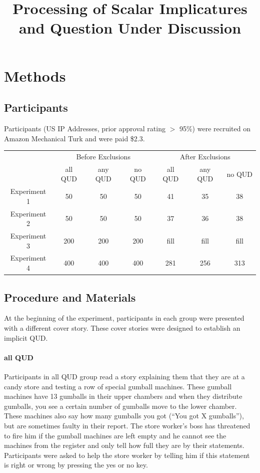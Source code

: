 \documentclass[12pt]{article}
\title{Processing of Scalar Implicatures and Question Under Discussion}
\begin{document}
 
\maketitle 

\section{Methods}
    \subsection*{Participants}

Participants (US IP Addresses, prior approval rating $>$ 95\%) were recruited on Amazon Mechanical Turk and were paid \$2.3.

\begin{table}[h]
\begin{tabular}{ccccccc}
& \multicolumn{3}{c}{Before Exclusions} & \multicolumn{3}{c}{After Exclusions} \\
& all QUD & any QUD & no QUD & all QUD & any QUD & no QUD \\
Experiment 1 & 50 & 50 & 50 & 41 & 35 & 38 \\
Experiment 2 & 50 & 50 & 50 & 37 & 36 & 38 \\
Experiment 3 & 200 & 200 & 200 & fill & fill & fill \\
Experiment 4 & 400 & 400 & 400 & 281 & 256 & 313
\end{tabular}
\end{table}

    \subsection*{Procedure and Materials}

At the beginning of the experiment, participants in each group were presented with a different cover story. These cover stories were designed to establish an implicit QUD.
\paragraph{all QUD} Participants in all QUD group read a story explaining them that they are at a candy store and testing a row of special gumball machines. These gumball machines have 13 gumballs in their upper chambers and when they distribute gumballs, you see a certain number of gumballs move to the lower chamber. These machines also say how many gumballs you got (“You got X gumballs”), but are sometimes faulty in their report. The store worker’s boss has threatened to fire him if the gumball machines are left empty and he cannot see the machines from the register and only tell how full they are by their statements. Participants were asked to help the store worker by telling him if this statement is right or wrong by pressing the yes or no key.
\end{document}
